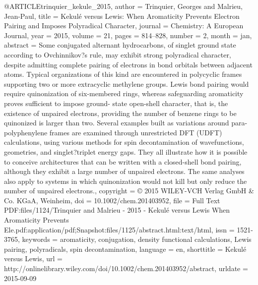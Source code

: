 @ARTICLE{trinquier_kekule_2015,
  author = {Trinquier, Georges and Malrieu, Jean-Paul},
  title = {Kekulé versus {Lewis}: {When} {Aromaticity} {Prevents} {Electron}
	{Pairing} and {Imposes} {Polyradical} {Character}},
  journal = {Chemistry: A European Journal},
  year = {2015},
  volume = {21},
  pages = {814--828},
  number = {2},
  month = jan,
  abstract = {Some conjugated alternant hydrocarbons, of singlet ground state according
	to Ovchinnikov?s rule, may exhibit strong polyradical character,
	despite admitting complete pairing of electrons in bond orbitals
	between adjacent atoms. Typical organizations of this kind are encountered
	in polycyclic frames supporting two or more extracyclic methylene
	groups. Lewis bond pairing would require quinonization of six-membered
	rings, whereas safeguarding aromaticity proves sufficient to impose
	ground- state open-shell character, that is, the existence of unpaired
	electrons, providing the number of benzene rings to be quinonized
	is larger than two. Several examples built as variations around para-polyphenylene
	frames are examined through unrestricted DFT (UDFT) calculations,
	using various methods for spin decontamination of wavefunctions,
	geometries, and singlet?triplet energy gaps. They all illustrate
	how it is possible to conceive architectures that can be written
	with a closed-shell bond pairing, although they exhibit a large number
	of unpaired electrons. The same analyses also apply to systems in
	which quinonization would not kill but only reduce the number of
	unpaired electrons.},
  copyright = {© 2015 WILEY-VCH Verlag GmbH \& Co. KGaA, Weinheim},
  doi = {10.1002/chem.201403952},
  file = {Full Text PDF:files/1124/Trinquier and Malrieu - 2015 - Kekulé versus Lewis When Aromaticity  Prevents Ele.pdf:application/pdf;Snapshot:files/1125/abstract.html:text/html},
  issn = {1521-3765},
  keywords = {aromaticity, conjugation, density functional calculations, Lewis pairing,
	polyradicals, spin decontamination},
  language = {en},
  shorttitle = {Kekulé versus {Lewis}},
  url = {http://onlinelibrary.wiley.com/doi/10.1002/chem.201403952/abstract},
  urldate = {2015-09-09}
}

